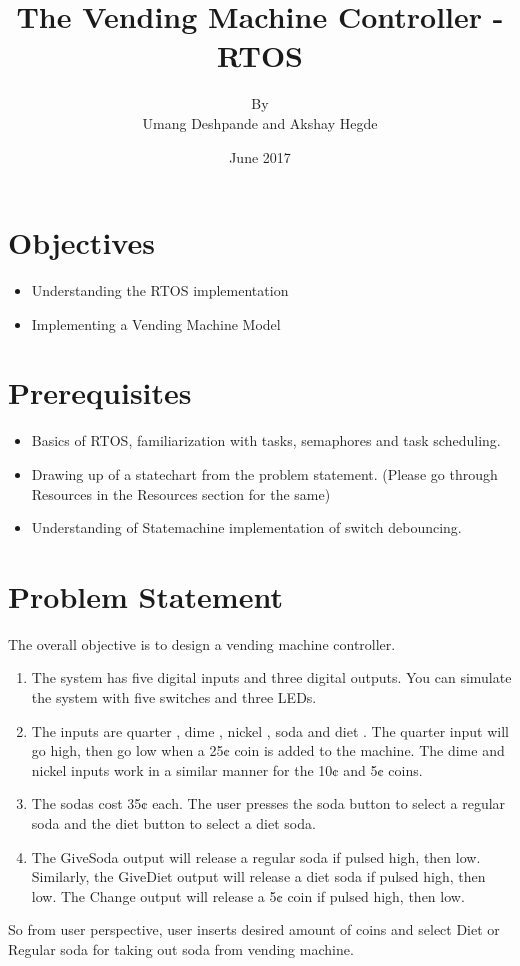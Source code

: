 \documentclass{article}
\title{The Vending Machine Controller - RTOS}
\author{By \\ Umang Deshpande and Akshay Hegde}
\date{June 2017}
\begin{document}
\maketitle

\section{Objectives}
\begin{itemize}
    \item Understanding the RTOS implementation
    \item Implementing a Vending Machine Model
\end{itemize}
\section{Prerequisites}
\begin{itemize}
    \item Basics of RTOS, familiarization with tasks, semaphores and task scheduling.
    \item Drawing up of a statechart from the problem statement. (Please go through Resources in the Resources section for the same)
    \item Understanding of Statemachine implementation of switch debouncing.
\end{itemize}
\section{Problem Statement}
\qquad The overall objective is to design a vending machine controller. 
\begin{enumerate}
\item The system has five digital inputs and three digital outputs. You can simulate the system with five switches and three LEDs.
\item The inputs are quarter , dime , nickel , soda and diet . The quarter input will go high, then go low when a 25¢ coin is added to the machine. The dime and nickel inputs work in a similar manner for the 10¢  and 5¢ coins.
\item The sodas cost 35¢ each. The user presses the soda button to select a regular soda and the diet button to select a diet soda.
\item The GiveSoda output will release a regular soda if pulsed high, then low. Similarly, the GiveDiet output will release a diet soda if pulsed high, then low. The Change output will release a 5¢ coin if pulsed high, then low.
\end{enumerate}
So from user perspective, user inserts desired amount of coins and select Diet or Regular soda for taking out soda from vending machine.
\end{document}

